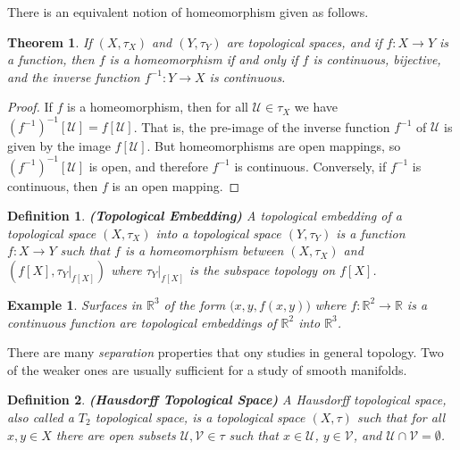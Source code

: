 \documentclass{article}
\theoremstyle{plain}
\newtheorem{theorem}{Theorem}[section]
\theoremstyle{normal}
\newtheorem{definition}{Definition}[section]
\newtheorem{example}{Example}[section]
\begin{document}
        There is an equivalent notion of homeomorphism given as follows.
        \begin{theorem}
            If $(X,\tau_{X})$ and $(Y,\tau_{Y})$ are topological spaces, and if
            $f:X\rightarrow{Y}$ is a function, then $f$ is a homeomorphism if
            and only if $f$ is continuous, bijective, and the inverse function
            $f^{-1}:Y\rightarrow{X}$ is continuous.
        \end{theorem}
        \begin{proof}
            If $f$ is a homeomorphism, then for all $\mathcal{U}\in\tau_{X}$ we
            have $(f^{-1})^{-1}[\mathcal{U}]=f[\mathcal{U}]$. That is, the
            pre-image of the inverse function $f^{-1}$ of $\mathcal{U}$ is given
            by the image $f[\mathcal{U}]$. But homeomorphisms are open mappings,
            so $(f^{-1})^{-1}[\mathcal{U}]$ is open, and therefore $f^{-1}$ is
            continuous. Conversely, if $f^{-1}$ is continuous, then $f$ is an
            open mapping.
        \end{proof}
        \begin{definition}{\textbf{(Topological Embedding)}}
            A topological embedding of a topological space $(X,\tau_{X})$ into a
            topological space $(Y,\tau_{Y})$ is a function $f:X\rightarrow{Y}$
            such that $f$ is a homeomorphism between $(X,\tau_{X})$ and
            $(f[X],\tau_{Y}|_{f[X]})$ where $\tau_{Y}|_{f[X]}$ is the subspace
            topology on $f[X]$.
        \end{definition}
        \begin{example}
            Surfaces in $\mathbb{R}^{3}$ of the form $\big(x,y,f(x,y)\big)$
            where $f:\mathbb{R}^{2}\rightarrow\mathbb{R}$ is a continuous
            function are topological embeddings of $\mathbb{R}^{2}$ into
            $\mathbb{R}^{3}$.
        \end{example}
        There are many \textit{separation} properties that ony studies in
        general topology. Two of the weaker ones are usually sufficient for a
        study of smooth manifolds.
        \begin{definition}{\textbf{(Hausdorff Topological Space)}}
            A Hausdorff topological space, also called a $T_{2}$ topological
            space, is a topological space $(X,\tau)$ such that for all
            $x,y\in{X}$ there are open subsets $\mathcal{U},\mathcal{V}\in\tau$
            such that $x\in\mathcal{U}$, $y\in\mathcal{V}$, and
            $\mathcal{U}\cap\mathcal{V}=\emptyset$.
        \end{definition}
\end{document}
